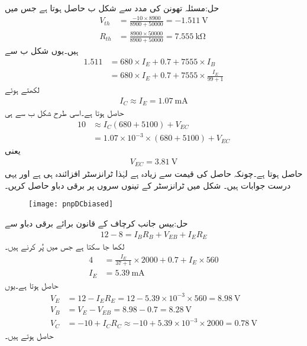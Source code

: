 حل:مسئلہ تھونن کی مدد سے شکل  ب حاصل ہوتا ہے جس میں
\begin{align*}
V_{th}&=\frac{-10 \times 8900}{8900+50000}=\SI{-1.511}{\volt}\\
R_{th}&=\frac{8900 \times 50000}{8900+50000}=\SI{7.555}{\kilo \ohm}
\end{align*}
ہیں۔یوں شکل  ب سے
\begin{align*}
1.511 &=680 \times I_E+0.7+7555 \times I_B\\
&=680 \times I_E+0.7+7555 \times \frac{I_E}{99+1}
\end{align*}
لکھتے ہوئے
\begin{align*}
I_C \approx I_E=\SI{1.07}{\milli \ampere}
\end{align*}
حاصل ہوتا ہے۔اسی طرح شکل  ب سے ہی 
\begin{align*}
10& \approx I_C \left(680 +5100\right)+V_{EC} \\
&=1.07 \times 10^{-3} \times \left(680 +5100\right)+V_{EC}
\end{align*}
یعنی
\begin{align*}
V_{EC}=\SI{3.81}{\volt}
\end{align*}
حاصل ہوتا ہے۔چونکہ حاصل  کی قیمت  سے زیادہ ہے لہٰذا ٹرانزسٹر افزائندہ ہی ہے اور یہی درست جوابات ہیں۔
شکل  میں ٹرانزسٹر کے تینوں سروں پر برقی دباو حاصل کریں۔
\begin{figure}
\centering
\texttt{[image: pnpDCbiased]}
\caption{}
\label{شکل_ٹرانزسٹر_یکسمتی_مائل_جمع_منفی_جمع}
\end{figure}

حل:بیس جانب کرچاف کے قانون برائے برقی دباو سے
\begin{align*}
12-8=I_B R_B + V_{EB}+I_E R_E
\end{align*}
لکھا جا سکتا ہے جس میں  پُر کرنے ہیں۔
\begin{align*}
4&=\frac{I_E}{37+1} \times 2000+0.7 +I_E \times 560\\
I_E&=\SI{5.39}{\milli \ampere}
\end{align*}
حاصل ہوتا ہے۔یوں
\begin{align*}
V_E&=12-I_E R_E=12-5.39 \times 10^{-3} \times 560=\SI{8.98}{\volt}\\
V_B&=V_E-V_{EB}=8.98-0.7=\SI{8.28}{\volt}\\
V_C&=-10+I_C R_C \approx -10 +5.39 \times 10^{-3} \times 2000=\SI{0.78}{\volt}
\end{align*}
حاصل ہوتے ہیں۔

